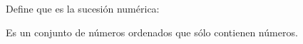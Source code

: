 
\question Define que es la sucesión numérica:
  \begin{solution}[2cm]
    Es un conjunto de números ordenados que sólo contienen números.
  \end{solution}
